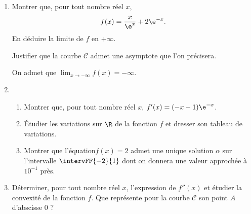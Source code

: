 \begin{enumerate}
	\item Montrer que, pour tout nombre réel $x$, \[ f(x)=\dfrac{x}{\e^x}+2\e^{-x}. \]
	En déduire la limite de $f$ en $+\infty$.
	
	Justifier que la courbe $\mathcal{C}$ admet une asymptote que l’on précisera.
	
	On admet que $\displaystyle\lim_{x \to -\infty} f(x)=-\infty$.
	\item 
	\begin{enumerate}
		\item Montrer que, pour tout nombre réel $x$, $f'(x)=(-x-1)\e^{-x}$.
		\item Étudier les variations sur $\R$ de la fonction $f$ et dresser son tableau de variations.
		\item Montrer que l’équation$f(x)=2$ admet une unique solution $\alpha$ sur l’intervalle $\intervFF{-2}{1}$ dont on donnera une valeur approchée à $10^{-1}$ près.
	\end{enumerate}
	\item Déterminer, pour tout nombre réel $x$, l’expression de $f''(x)$ et étudier la convexité de la fonction $f$. Que représente pour la courbe $\mathcal{C}$ son point $A$ d’abscisse $0$ ?
\end{enumerate}